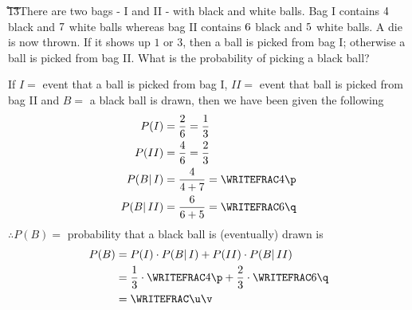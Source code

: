 


\ADD\vbone\vbtwo\p
\ADD\vbthree\vbfour\q
\MULTIPLY{}\r
\FRACADD\vbone\p\r\q\s\t
\FRACMULT\s\t{1}{3}\u\v

\question There are two bags - I and II - with black and white balls. Bag I contains $4$ black 
and $7$ white balls whereas bag II contains $6$ black and $5$ white balls. A die
is now thrown. If it shows up $1$ or $3$, then a ball is picked from bag I; otherwise a ball is picked
from bag II. What is the probability of picking a black ball?

\insertQR[10pt]{}

\watchout[-50pt]

\ifprintanswers
\fi 

\begin{solution}
	If $I =$ event that a ball is picked from bag I, $II=$ event that ball is picked from bag II
	and $B =$ a black ball is drawn, then we have been given the following
	\begin{align}
		P(I) &= \dfrac{2}{6} = \dfrac{1}{3} \\
		P(II) &= \dfrac{4}{6} = \dfrac{2}{3} \\
		P(B\vert\,I) &= \dfrac{\vbone}{\vbone+\vbtwo} = \WRITEFRAC\vbone\p \\
		P(B\vert\,II) &= \dfrac{\vbthree}{\vbthree+\vbfour} = \WRITEFRAC\vbthree\q
	\end{align}
	$\therefore P(B) = $ probability that a black ball is (eventually) drawn is
	\begin{align}
		P(B) &= P(I)\cdot P(B\vert\,I) + P(II)\cdot P(B\vert\, II) \\
		&= \dfrac{1}{3}\cdot\WRITEFRAC\vbone\p + \dfrac{2}{3}\cdot\WRITEFRAC\vbthree\q \\
		&= \WRITEFRAC\u\v
	\end{align}
\end{solution}


